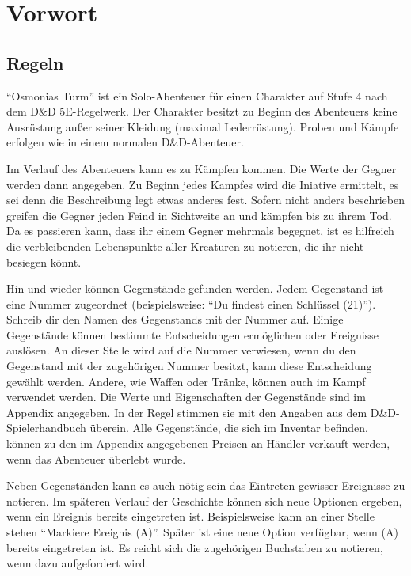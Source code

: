 
\chapter*{Vorwort}

\section{Regeln}

``Osmonias Turm'' ist ein Solo-Abenteuer für einen Charakter auf Stufe 4 nach dem D\&D 5E-Regelwerk. Der Charakter besitzt zu Beginn des Abenteuers keine Ausrüstung außer seiner Kleidung (maximal Lederrüstung). Proben und Kämpfe erfolgen wie in einem normalen D\&D-Abenteuer.

Im Verlauf des Abenteuers kann es zu Kämpfen kommen. Die Werte der Gegner werden dann angegeben. Zu Beginn jedes Kampfes wird die Iniative ermittelt, es sei denn die Beschreibung legt etwas anderes fest. Sofern nicht anders beschrieben greifen die Gegner jeden Feind in Sichtweite an und kämpfen bis zu ihrem Tod. Da es passieren kann, dass ihr einem Gegner mehrmals begegnet, ist es hilfreich die verbleibenden Lebenspunkte aller Kreaturen zu notieren, die ihr nicht besiegen könnt.

Hin und wieder können Gegenstände gefunden werden. Jedem Gegenstand ist eine Nummer zugeordnet (beispielsweise: ``Du findest einen Schlüssel (21)''). Schreib dir den Namen des Gegenstands mit der Nummer auf. Einige Gegenstände können bestimmte Entscheidungen ermöglichen oder Ereignisse auslösen. An dieser Stelle wird auf die Nummer verwiesen, wenn du den Gegenstand mit der zugehörigen Nummer besitzt, kann diese Entscheidung gewählt werden. Andere, wie Waffen oder Tränke, können auch im Kampf verwendet werden. Die Werte und Eigenschaften der Gegenstände sind im Appendix angegeben. In der Regel stimmen sie mit den Angaben aus dem D\&D-Spielerhandbuch überein. Alle Gegenstände, die sich im Inventar befinden, können zu den im Appendix angegebenen Preisen an Händler verkauft werden, wenn das Abenteuer überlebt wurde.

Neben Gegenständen kann es auch nötig sein das Eintreten gewisser Ereignisse zu notieren. Im späteren Verlauf der Geschichte können sich neue Optionen ergeben, wenn ein Ereignis bereits eingetreten ist. Beispielsweise kann an einer Stelle stehen ``Markiere Ereignis (A)''. Später ist eine neue Option verfügbar, wenn (A) bereits eingetreten ist. Es reicht sich die zugehörigen Buchstaben zu notieren, wenn dazu aufgefordert wird.

